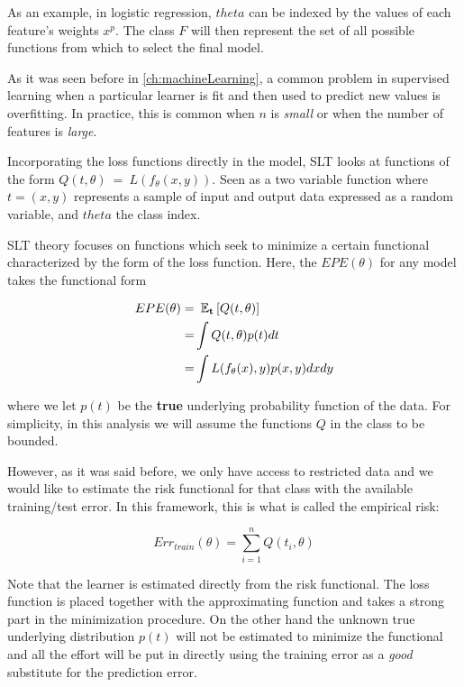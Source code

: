 As an example, in logistic regression, $theta$ can be indexed by the values of each feature's weights $x^p$. The class $F$ will then represent the set of all possible functions from which to select the final model.

As it was seen before in \cref{ch:machineLearning}, a common problem in supervised learning when a particular learner is fit and then used to predict new values is overfitting. In practice, this is common when $n$ is \textit{small} or when the number of features is \textit{large}.

Incorporating the loss functions directly in the model, SLT looks at functions of the form $Q(t,\theta) \ = \ L(f_\theta(x,y))$. Seen as a two variable function where $t=(x,y)$ represents a sample of input and output data expressed as a random variable, and $theta$ the class index.

SLT theory focuses on functions which seek to minimize a certain functional characterized by the form of the loss function. Here, the $EPE(\theta)$ for any model takes the functional form

\begin{equation}
\begin{split}
EPE(\theta) = & \ \operatorname{\mathbb{E}}_{\textbf{t}} \left[ Q(t,\theta) \right]\\
= & \int Q(t,\theta) p(t) dt \\
= & \int L(f_\theta(x),y) p(x,y) dx dy
\end{split}
\end{equation}\label{eq:vapnik-risk}

where we let $p(t)$ be the \textbf{true} underlying probability function of the data. For simplicity, in this analysis we will assume the functions $Q$ in the class to be bounded.

However, as it was said before, we only have access to restricted data and we would like to estimate the risk functional for that class with the available training/test error. In this framework, this is what is called the empirical risk:

\begin{equation}\label{vapnik-empiricalRisk}
Err_{train}(\theta) = \sum_{i=1}^n Q(t_i,\theta)
\end{equation}

Note that the learner is estimated directly from the risk functional. The loss function is placed together with the approximating function and takes a strong part in the minimization procedure. On the other hand the unknown true underlying distribution $p(t)$ will not be estimated to minimize the functional and all the effort will be put in directly using the training error as a \textit{good} substitute for the prediction error.


